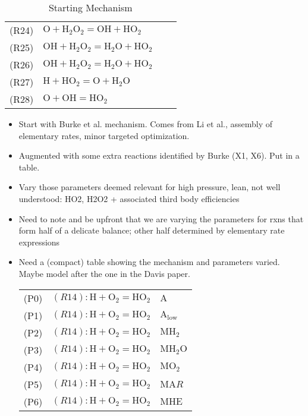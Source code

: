 \documentclass[preprint,3p,times,twocolumn]{elsarticle}
\begin{document}
\begin{table}[htp]
\begin{tabular}{l l l l}
(R24)&$ \mathrm{O} + \mathrm{H}_2\mathrm{O}_2 = \mathrm{OH} + \mathrm{HO}_2$\\
(R25)&$ \mathrm{OH} + \mathrm{H}_2\mathrm{O}_2 = \mathrm{H}_2\mathrm{O} + \mathrm{HO}_2$\\
(R26)&$ \mathrm{OH} + \mathrm{H}_2\mathrm{O}_2 = \mathrm{H}_2\mathrm{O} + \mathrm{HO}_2$\\
(R27)&$ \mathrm{H} + \mathrm{HO}_2 = \mathrm{O} + \mathrm{H}_2\mathrm{O}$\\
(R28)&$ \mathrm{O} + \mathrm{OH} = \mathrm{HO}_2$\\
\hline
  \end{tabular}
  \caption{Starting Mechanism}
  \label{tab:srcmech}
\end{table}
\begin{itemize}
\item Start with Burke et al. mechanism. Comes from Li et al.,
  assembly of elementary rates, minor targeted optimization.
\item Augmented with some extra reactions identified by Burke (X1,
  X6). Put in a table.
\item Vary those parameters deemed relevant for high pressure, lean,
  not well understood: HO2, H2O2 + associated third body efficiencies
\item Need to note and be upfront that we are varying the parameters
  for rxns that form half of a delicate balance; other half determined
  by elementary rate expressions
\item Need a (compact) table showing the mechanism and parameters
  varied. Maybe model after the one in the Davis paper.
  \begin{table}[htp]
    \centering
    \begin{tabular}{l l l}
      \hline
(P0)&$ (R14): \mathrm{H} + \mathrm{O}_2 = \mathrm{HO}_2     $&$ \mathrm{A}$\\
(P1)&$ (R14): \mathrm{H} + \mathrm{O}_2 = \mathrm{HO}_2     $&$ \mathrm{A}_\mathrm{low}$\\
(P2)&$ (R14): \mathrm{H} + \mathrm{O}_2 = \mathrm{HO}_2     $&$ \mathrm{M} \mathrm{H}_2$\\
(P3)&$ (R14): \mathrm{H} + \mathrm{O}_2 = \mathrm{HO}_2     $&$ \mathrm{M} \mathrm{H}_2\mathrm{O}$\\
(P4)&$ (R14): \mathrm{H} + \mathrm{O}_2 = \mathrm{HO}_2     $&$ \mathrm{M} \mathrm{O}_2$\\
(P5)&$ (R14): \mathrm{H} + \mathrm{O}_2 = \mathrm{HO}_2     $&$ \mathrm{M} \mathrm{A}R$\\
(P6)&$ (R14): \mathrm{H} + \mathrm{O}_2 = \mathrm{HO}_2     $&$ \mathrm{M} \mathrm{HE}$\\

\end{tabular}
\end{table}
\end{itemize}
\end{document}
